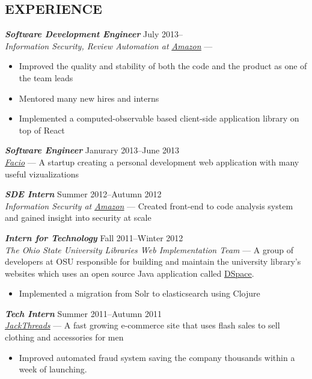\documentclass[line,letterpaper]{resume}
\begin{document}
\begin{resume}
    \section{\uppercase{Experience}}

    {\sl\textbf{Software Development Engineer}} \hfill July 2013--\\
    \emph{Information Security, Review Automation at
    \underline{\href{http://www.amazon.com/}{Amazon}}} ---
    \begin{itemize}
        \item Improved the quality and stability of both the code and the
            product as one of the team leads
        \item Mentored many new hires and interns
        \item Implemented a computed-observable based client-side application
            library on top of React
    \end{itemize}
    \vspace{-6pt}

    {\sl\textbf{Software Engineer}} \hfill Janurary 2013--June 2013\\
    \emph{\underline{\href{http://www.facio.com/}{Facio}}} ---
    A startup creating a personal development web application with many
    useful vizualizations
    \vspace{-6pt}

    {\sl\textbf{SDE Intern}} \hfill Summer 2012--Autumn 2012\\
    \emph{Information Security at
    \underline{\href{http://www.amazon.com/}{Amazon}}} --- Created front-end to
    code analysis system and gained insight into security at scale
    \vspace{-6pt}

    {\sl\textbf{Intern for Technology}} \hfill Fall 2011--Winter 2012\\
    \emph{The Ohio State University Libraries Web Implementation Team} --- A
    group of developers at OSU responsible for building and maintain the
    university library's websites which uses an open source Java application
    called
    \underline{\href{https://github.com/osulibraries/DSpaceOSUKB/wiki}{DSpace}}.
    \begin{itemize}
        \item Implemented a migration from Solr to elasticsearch using Clojure
    \end{itemize}
    \vspace{-6pt}

    {\sl\textbf{Tech Intern}} \hfill Summer 2011--Autumn 2011\\
    \emph{\underline{\href{http://www.jackthreads.com/}{JackThreads}}}
    --- A fast growing e-commerce site that uses flash sales to sell clothing and
    accessories for men
    \begin{itemize}
        \item Improved automated fraud system saving the company
            thousands within a week of launching.
    \end{itemize}
    \vspace{-6pt}


\end{resume}
\end{document}
